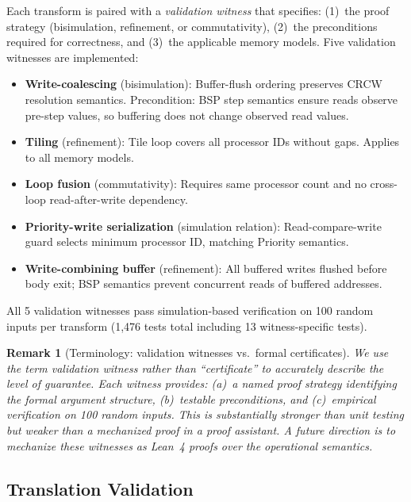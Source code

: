 \documentclass[11pt]{article}
\newtheorem{remark}[theorem]{Remark}
\begin{document}
Each transform is paired with a \emph{validation witness} that
specifies: (1)~the proof strategy (bisimulation, refinement, or
commutativity), (2)~the preconditions required for correctness, and
(3)~the applicable memory models.  Five validation witnesses are implemented:

\begin{itemize}[leftmargin=*]
\item \textbf{Write-coalescing} (bisimulation): Buffer-flush ordering
  preserves CRCW resolution semantics.  Precondition: BSP step semantics
  ensure reads observe pre-step values, so buffering does not change
  observed read values.
\item \textbf{Tiling} (refinement): Tile loop covers all processor IDs
  without gaps.  Applies to all memory models.
\item \textbf{Loop fusion} (commutativity): Requires same processor count
  and no cross-loop read-after-write dependency.
\item \textbf{Priority-write serialization} (simulation relation):
  Read-compare-write guard selects minimum processor ID, matching
  Priority semantics.
\item \textbf{Write-combining buffer} (refinement): All buffered writes
  flushed before body exit; BSP semantics prevent concurrent reads of
  buffered addresses.
\end{itemize}

All 5 validation witnesses pass simulation-based verification on 100 random
inputs per transform (1,476 tests total including 13 witness-specific
tests).

\begin{remark}[Terminology: validation witnesses vs.\ formal certificates]
We use the term \emph{validation witness} rather than ``certificate''
to accurately describe the level of guarantee.  Each witness provides:
(a)~a named proof strategy identifying the formal argument structure,
(b)~testable preconditions, and (c)~empirical verification on 100 random
inputs.  This is substantially stronger than unit testing but weaker than
a mechanized proof in a proof assistant.  A future direction is to
mechanize these witnesses as Lean~4 proofs over the operational
semantics.
\end{remark}

\subsection{Translation Validation}
\end{document}
